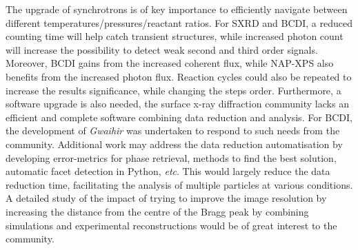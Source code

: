 The upgrade of synchrotrons is of key importance to efficiently navigate between different temperatures/pressures/reactant ratios.
For SXRD and BCDI, a reduced counting time will help catch transient structures, while increased photon count will increase the possibility to detect weak second and third order signals.
Moreover, BCDI gains from the increased coherent flux, while NAP-XPS also benefits from the increased photon flux.
Reaction cycles could also be repeated to increase the results significance, while changing the steps order.
Furthermore, a software upgrade is also needed, the surface x-ray diffraction community lacks an efficient and complete software combining data reduction and analysis.
For BCDI, the development of \textit{Gwaihir} was undertaken to respond to such needs from the community.
Additional work may address the data reduction automatisation by developing error-metrics for phase retrieval, methods to find the best solution, automatic facet detection in Python, \textit{etc}.
This would largely reduce the data reduction time, facilitating the analysis of multiple particles at various conditions.
A detailed study of the impact of trying to improve the image resolution by increasing the distance from the centre of the Bragg peak by combining simulations and experimental reconstructions would be of great interest to the community.